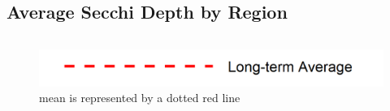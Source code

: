 \documentclass[
]{book}
\begin{document}
\hypertarget{average-secchi-depth-by-region}{%
\subsection{Average Secchi Depth by Region}\label{average-secchi-depth-by-region}}

\begin{columns-nocenter}

\begin{column}

\begin{figure}
\includegraphics[width=15.25in]{figures/mline} \caption{mean is represented by a dotted red line}\label{fig:unnamed-chunk-7}
\end{figure}

\end{column}

\begin{column}

\end{column}

\begin{column}

\end{column}

\end{columns-nocenter}
\end{document}
